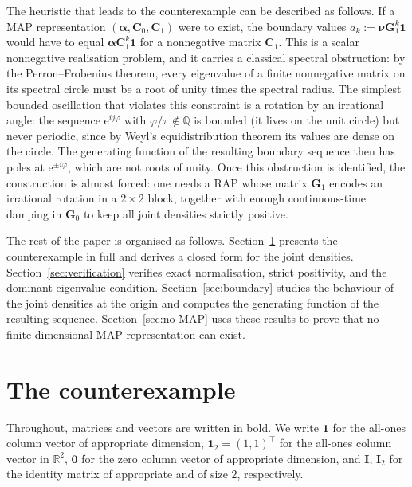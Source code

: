 \documentclass[11pt]{article}
\theoremstyle{definition}
\theoremstyle{remark}
\newcommand{\e}{\mathrm{e}}
\newcommand{\bzero}{\bm{0}}
\newcommand{\Q}{\mathbb{Q}}
\begin{document}
The heuristic that leads to the counterexample can be described as follows. If a MAP representation $(\bm{\alpha},\bm{C}_0,\bm{C}_1)$ were to exist, the boundary values $a_k:=\bm{\nu}\bm{G}_1^k\bm{1}$ would have to equal $\bm{\alpha}\bm{C}_1^k\bm{1}$ for a nonnegative matrix $\bm{C}_1$. This is a scalar nonnegative realisation problem, and it carries a classical spectral obstruction: by the Perron--Frobenius theorem, every eigenvalue of a finite nonnegative matrix on its spectral circle must be a root of unity times the spectral radius. The simplest bounded oscillation that violates this constraint is a rotation by an irrational angle: the sequence $\e^{ij\varphi}$ with $\varphi/\pi\notin\Q$ is bounded (it lives on the unit circle) but never periodic, since by Weyl's equidistribution theorem its values are dense on the circle. The generating function of the resulting boundary sequence then has poles at $\e^{\pm i\varphi}$, which are not roots of unity. Once this obstruction is identified, the construction is almost forced: one needs a RAP whose matrix $\bm{G}_1$ encodes an irrational rotation in a $2\times2$ block, together with enough continuous-time damping in $\bm{G}_0$ to keep all joint densities strictly positive.

The rest of the paper is organised as follows.
Section~\ref{sec:construction} presents the counterexample in full and derives a closed form for the joint densities.
Section~\ref{sec:verification} verifies exact normalisation, strict positivity, and the dominant-eigenvalue condition.
Section~\ref{sec:boundary} studies the behaviour of the joint densities
at the origin and computes the generating function of the resulting sequence.
Section~\ref{sec:no-MAP} uses these results to prove that no finite-dimensional MAP representation can exist.

\section{The counterexample}\label{sec:construction}

Throughout, matrices and vectors are written in bold. We write $\bm{1}$ for the all-ones column vector of appropriate dimension, $\bm{1}_2=(1,1)^\top$ for the all-ones column vector in $\mathbb{R}^2$, $\bzero$ for the zero column vector of appropriate dimension, and $\bm{I}$, $\bm{I}_2$ for the identity matrix of appropriate and of size $2$, respectively.
\end{document}
